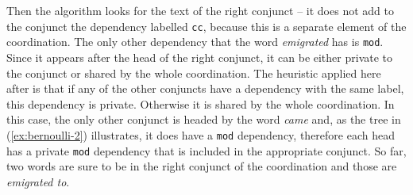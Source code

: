 \vspace{2ex}
\begin{exe}
\ex\label{ex:bernoulli-1}
\end{exe}
\vspace{1ex}

Then the algorithm looks for the text of the right conjunct -- it does not add to the conjunct the dependency labelled \texttt{cc}, because this is a separate element of the coordination. The only other dependency that the word \textsl{emigrated} has is \texttt{mod}. Since it appears after the head of the right conjunct, it can be either private to the conjunct or shared by the whole coordination. The heuristic applied here after \cite{prz:etal:24} is that if any of the other conjuncts have a dependency with the same label, this dependency is private. Otherwise it is shared by the whole coordination. In this case, the only other conjunct is headed by the word \textsl{came} and, as the tree in (\ref{ex:bernoulli-2}) illustrates, it does have a \texttt{mod} dependency, therefore each head has a private \texttt{mod} dependency that is included in the appropriate conjunct. So far, two words are sure to be in the right conjunct of the coordination and those are \textsl{emigrated to}.

